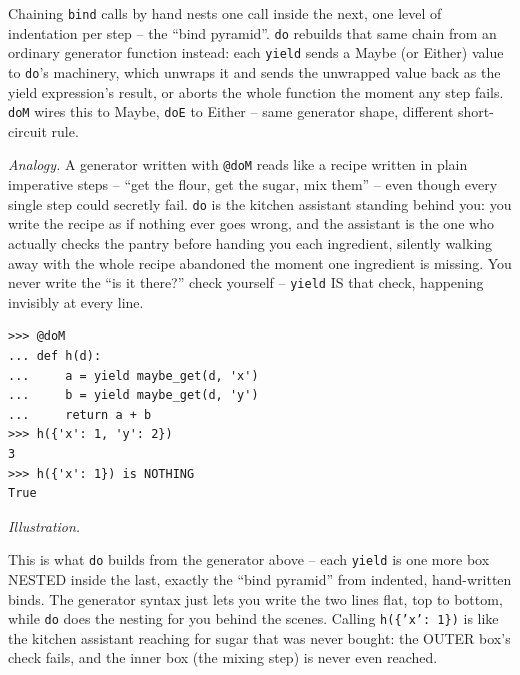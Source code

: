 \documentclass[10pt,letterpaper]{book}
\begin{document}
Chaining \texttt{bind} calls by hand nests one call inside the next, one level of indentation per
step -- the ``bind pyramid''. \texttt{do} rebuilds that same chain from an ordinary generator
function instead: each \texttt{yield} sends a Maybe (or Either) value to \texttt{do}'s machinery,
which unwraps it and sends the unwrapped value back as the yield expression's result, or aborts the
whole function the moment any step fails. \texttt{doM} wires this to Maybe, \texttt{doE} to Either --
same generator shape, different short-circuit rule.

\textit{Analogy.} A generator written with \texttt{@doM} reads like a recipe written in plain
imperative steps -- ``get the flour, get the sugar, mix them'' -- even though every single step could
secretly fail. \texttt{do} is the kitchen assistant standing behind you: you write the recipe as if
nothing ever goes wrong, and the assistant is the one who actually checks the pantry before handing
you each ingredient, silently walking away with the whole recipe abandoned the moment one ingredient
is missing. You never write the ``is it there?'' check yourself -- \texttt{yield} IS that check,
happening invisibly at every line.
\begin{lstlisting}[style=ex]
>>> @doM
... def h(d):
...     a = yield maybe_get(d, 'x')
...     b = yield maybe_get(d, 'y')
...     return a + b
>>> h({'x': 1, 'y': 2})
3
>>> h({'x': 1}) is NOTHING
True
\end{lstlisting}
\noindent\textit{Illustration.}
\begin{center}
\end{center}
This is what \texttt{do} builds from the generator above -- each \texttt{yield} is one more box
NESTED inside the last, exactly the ``bind pyramid'' from indented, hand-written binds. The
generator syntax just lets you write the two lines flat, top to bottom, while \texttt{do} does the
nesting for you behind the scenes. Calling \texttt{h(\{'x': 1\})} is like the kitchen assistant
reaching for sugar that was never bought: the OUTER box's check fails, and the inner box (the mixing
step) is never even reached.
\end{document}
